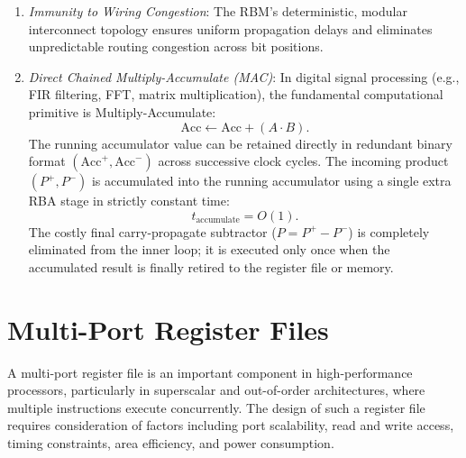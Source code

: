 \begin{itemize}
\begin{enumerate}
        \item \textit{Immunity to Wiring Congestion}: The RBM's deterministic, modular interconnect topology ensures uniform propagation delays and eliminates unpredictable routing congestion across bit positions.
        
        \item \textit{Direct Chained Multiply-Accumulate (MAC)}: In digital signal processing (e.g., FIR 
        filtering, FFT, matrix multiplication), the fundamental computational primitive is Multiply-Accumulate:
        \begin{equation}
        \text{Acc} \leftarrow \text{Acc} + (A \cdot B).
        \end{equation}
        The running accumulator value can be retained directly in redundant binary format $(\text{Acc}^+, \text{Acc}^-)$ across successive clock cycles. The incoming product $(P^+, P^-)$ is accumulated into the running accumulator using a single extra RBA stage in strictly constant time:
        \begin{equation}
        t_{\text{accumulate}} = O(1).
        \end{equation}
        The costly final carry-propagate subtractor ($P = P^+ - P^-$) is completely eliminated from the inner loop; it is executed only once when the accumulated result is finally retired to the register file or memory.
    \end{enumerate}
\end{itemize}



\section{Multi-Port Register Files}

A multi-port register file is an important component in high-performance processors, particularly in superscalar and out-of-order architectures, where multiple instructions execute concurrently. The design of such a register file requires consideration of factors including port scalability, read and write access, timing constraints, area efficiency, and power consumption. 

